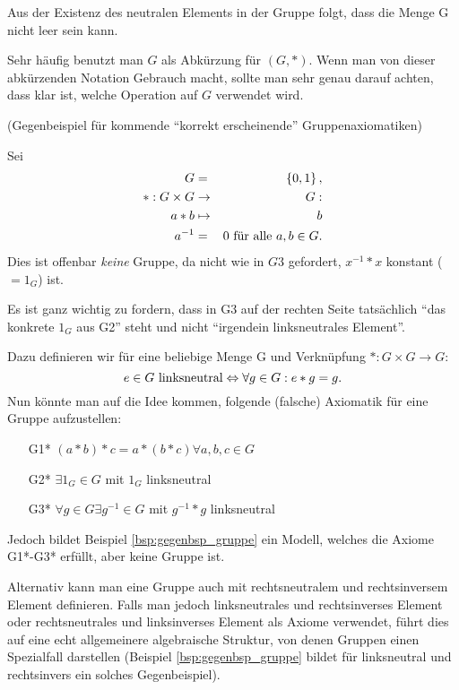 \documentclass[10pt]{scrbook}
\begin{document}
\begin{Bem}
Aus der Existenz des neutralen Elements in der Gruppe folgt, dass die Menge G nicht leer sein kann.
\end{Bem}

\begin{Bem}
Sehr häufig benutzt man $G$ als Abkürzung für $(G, *)$. Wenn man von dieser abkürzenden Notation Gebrauch macht, sollte man sehr genau darauf achten, dass klar ist, welche Operation auf $G$ verwendet wird.
\end{Bem}

\begin{Bsp}
\label{bsp:gegenbsp_gruppe}
(Gegenbeispiel für kommende "`korrekt erscheinende"' Gruppenaxiomatiken)

Sei
\begin{eqnarray*}
G & = & \left\{0, 1\right\}, \\
*: G\times G & \rightarrow & G: \\
a*b & \mapsto & b \\
a^{-1} & = & 0 \textnormal{ für alle }a, b\in G.
\end{eqnarray*}
Dies ist offenbar \emph{keine} Gruppe, da nicht wie in $G3$ gefordert, $x^{-1}*x$ konstant ($=1_G$) ist.
\end{Bsp}

\begin{Bem}
Es ist ganz wichtig zu fordern, dass in G3 auf der rechten Seite tatsächlich "`das konkrete $1_G$ aus G2"' steht und nicht "`irgendein linksneutrales Element"'.

Dazu definieren wir für eine beliebige Menge G und Verknüpfung $*:G\times G\rightarrow G$:
\begin{displaymath}
e\in G\textnormal{ linksneutral}\Leftrightarrow \forall g\in G: e*g=g.
\end{displaymath}
Nun könnte man auf die Idee kommen, folgende (falsche) Axiomatik für eine Gruppe aufzustellen:
\begin{enumerate}
	\item[G1*] $(a*b)*c=a*(b*c)\forall a, b, c\in G$
	\item[G2*] $\exists 1_G\in G$ mit $1_G$ linksneutral
	\item[G3*] $\forall g\in G\exists g^{-1}\in G$ mit $g^{-1}*g$ linksneutral
\end{enumerate}
Jedoch bildet Beispiel \ref{bsp:gegenbsp_gruppe} ein Modell, welches die Axiome G1*-G3* erfüllt, aber keine Gruppe ist.
\end{Bem}
\begin{Bem}
Alternativ kann man eine Gruppe auch mit rechtsneutralem und rechtsinversem Element definieren. Falls man jedoch linksneutrales und rechtsinverses Element oder rechtsneutrales und linksinverses Element als Axiome verwendet, führt dies auf eine echt allgemeinere algebraische Struktur, von denen Gruppen einen Spezialfall darstellen (Beispiel \ref{bsp:gegenbsp_gruppe} bildet für linksneutral und rechtsinvers ein solches Gegenbeispiel).
\end{Bem}
\end{document}
